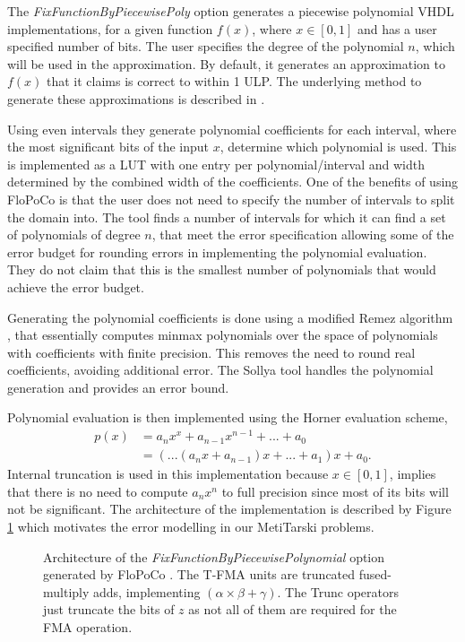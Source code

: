 \documentclass{fac}
\begin{document}
The \textit{FixFunctionByPiecewisePoly} option generates a piecewise polynomial VHDL implementations, for a given function $f(x)$, where $x\in [0,1]$ and has a user specified number of bits. The user specifies the degree of the polynomial $n$, which will be used in the approximation. By default, it generates an approximation to $f(x)$ that it claims is correct to within 1 ULP. The underlying method to generate these approximations is described in \cite{DinJolPas2010-poly}. 

Using even intervals they generate polynomial coefficients for each interval, where the most significant bits of the input $x$, determine which polynomial is used. This is implemented as a LUT with one entry per polynomial/interval and width determined by the combined width of the coefficients. One of the benefits of using FloPoCo is that the user does not need to specify the number of intervals to split the domain into. The tool finds a number of intervals for which it can find a set of polynomials of degree $n$, that meet the error specification allowing some of the error budget for rounding errors in implementing the polynomial evaluation. They do not claim that this is the smallest number of polynomials that would achieve the error budget. 

Generating the polynomial coefficients is done using a modified Remez algorithm \cite{brisebarre2007efficient}, that essentially computes minmax polynomials over the space of polynomials with coefficients with finite precision. This removes the need to round real coefficients, avoiding additional error. The Sollya tool \cite{ChevillardJoldesLauter2010} handles the polynomial generation and provides an error bound. 

Polynomial evaluation is then implemented using the Horner evaluation scheme, 
\begin{align*}
    p(x) &= a_n x^x + a_{n-1}x^{n-1} + ... + a_0 \\
         &= (...(a_n x + a_{n-1})x + ...+a_1)x + a_0.
\end{align*}
Internal truncation is used in this implementation because $x\in [0,1]$, implies that there is no need to compute $a_n x^n$ to full precision since most of its bits will not be significant. The architecture of the implementation is described by Figure \ref{horner_arch} which motivates the error modelling in our MetiTarski problems.

\begin{figure}
\centering

\caption{Architecture of the \textit{FixFunctionByPiecewisePolynomial} option generated by FloPoCo \cite{DinJolPas2010-poly}. The T-FMA units are truncated fused-multiply adds, implementing $(\alpha\times \beta + \gamma)$. The Trunc operators just truncate the bits of $z$ as not all of them are required for the FMA operation.\label{horner_arch}}
\end{figure}
\end{document}
